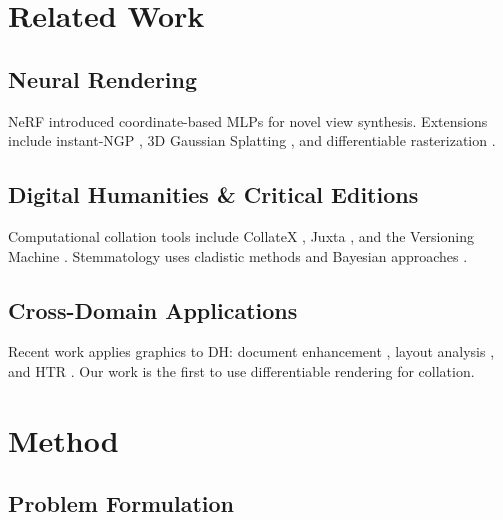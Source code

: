 \documentclass[12pt,a4paper]{article}
\begin{document}
\section{Related Work}
\label{sec:related}

\subsection{Neural Rendering}
\label{sec:rw-rendering}

NeRF \parencite{mildenhall2021nerf} introduced coordinate-based MLPs for
novel view synthesis. Extensions include instant-NGP \parencite{muller2022instant},
3D Gaussian Splatting \parencite{kerbl20233d}, and differentiable
rasterization \parencite{laine2020diffrast}.

\subsection{Digital Humanities \& Critical Editions}
\label{sec:rw-dh}

Computational collation tools include CollateX \parencite{dekker2015collatex},
Juxta \parencite{juxta}, and the Versioning Machine \parencite{vmachine}.
Stemmatology uses cladistic methods \parencite{spencer2004cladistics}
and Bayesian approaches \parencite{barbrook2005bayesian}.

\subsection{Cross-Domain Applications}
\label{sec:rw-cross}

Recent work applies graphics to DH: document enhancement
\parencite{stamatopoulos2020document}, layout analysis
\parencite{pavlopoulos2023layout}, and HTR \parencite{bluche2017htr}.
Our work is the first to use differentiable rendering for collation.

\section{Method}
\label{sec:method}

\subsection{Problem Formulation}
\label{sec:formulation}
\end{document}
